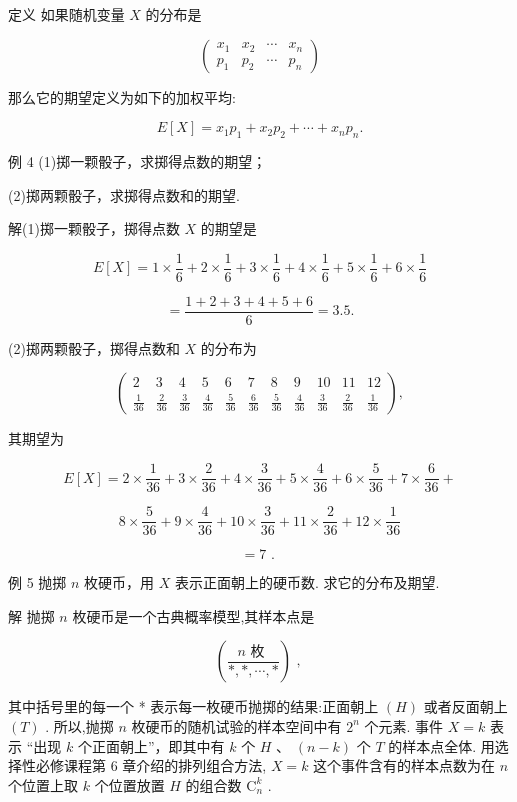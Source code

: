 \documentclass[10pt]{article}
\begin{document}
定义 如果随机变量 \(X\) 的分布是

\[
\left( \begin{array}{llll} {x}_{1} & {x}_{2} & \cdots & {x}_{n} \\  {p}_{1} & {p}_{2} & \cdots & {p}_{n} \end{array}\right)
\]

那么它的期望定义为如下的加权平均:

\[
E\left\lbrack  X\right\rbrack   = {x}_{1}{p}_{1} + {x}_{2}{p}_{2} + \cdots  + {x}_{n}{p}_{n}.
\]

例 4 (1)掷一颗骰子，求掷得点数的期望；

(2)掷两颗骰子，求掷得点数和的期望.

解(1)掷一颗骰子，掷得点数 \(X\) 的期望是

\[
E\left\lbrack  X\right\rbrack   = 1 \times  \frac{1}{6} + 2 \times  \frac{1}{6} + 3 \times  \frac{1}{6} + 4 \times  \frac{1}{6} + 5 \times  \frac{1}{6} + 6 \times  \frac{1}{6}
\]

\[
= \frac{1 + 2 + 3 + 4 + 5 + 6}{6} = {3.5}.
\]

(2)掷两颗骰子，掷得点数和 \(X\) 的分布为

\[
\left( \begin{matrix} 2 & 3 & 4 & 5 & 6 & 7 & 8 & 9 & {10} & {11} & {12} \\  \frac{1}{36} & \frac{2}{36} & \frac{3}{36} & \frac{4}{36} & \frac{5}{36} & \frac{6}{36} & \frac{5}{36} & \frac{4}{36} & \frac{3}{36} & \frac{2}{36} & \frac{1}{36} \end{matrix}\right) ,
\]

其期望为

\[
E\left\lbrack  X\right\rbrack   = 2 \times  \frac{1}{36} + 3 \times  \frac{2}{36} + 4 \times  \frac{3}{36} + 5 \times  \frac{4}{36} + 6 \times  \frac{5}{36} + 7 \times  \frac{6}{36} +
\]

\[
8 \times  \frac{5}{36} + 9 \times  \frac{4}{36} + {10} \times  \frac{3}{36} + {11} \times  \frac{2}{36} + {12} \times  \frac{1}{36}
\]

\[
= 7\text{ . }
\]

例 5 抛掷 \(n\) 枚硬币，用 \(X\) 表示正面朝上的硬币数. 求它的分布及期望.

解 抛掷 \(n\) 枚硬币是一个古典概率模型,其样本点是

\[
\left( \frac{n\text{ 枚 }}{*, * ,\cdots , * }\right) \text{ , }
\]

其中括号里的每一个 * 表示每一枚硬币抛掷的结果:正面朝上 \(\left( H\right)\) 或者反面朝上 \(\left( T\right)\) . 所以,抛掷 \(n\) 枚硬币的随机试验的样本空间中有 \({2}^{n}\) 个元素. 事件 \(X = k\) 表示 “出现 \(k\) 个正面朝上”，即其中有 \(k\) 个 \(H\text{ 、 }\left( {n - k}\right)\) 个 \(T\) 的样本点全体. 用选择性必修课程第 6 章介绍的排列组合方法, \(X = k\) 这个事件含有的样本点数为在 \(n\) 个位置上取 \(k\) 个位置放置 \(H\) 的组合数 \({\mathrm{C}}_{n}^{k}\) .
\end{document}
